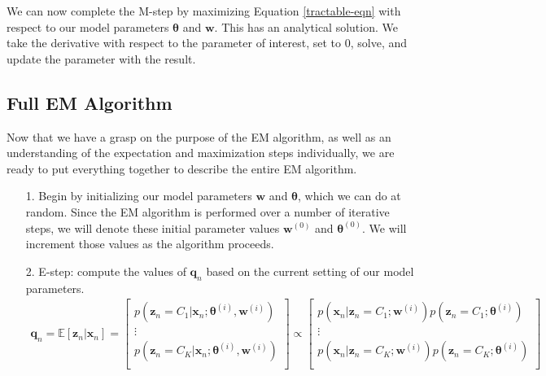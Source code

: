 We can now complete the M-step by maximizing Equation \ref{tractable-eqn} with respect to our model parameters $\boldsymbol{\theta}$ and $\textbf{w}$. This has an analytical solution. We take the derivative with respect to the parameter of interest, set to 0, solve, and update the parameter with the result.

\subsection{Full EM Algorithm}

Now that we have a grasp on the purpose of the EM algorithm, as well as an understanding of the expectation and maximization steps individually, we are ready to put everything together to describe the entire EM algorithm.

\begin{itemize}
    \item[1.] Begin by initializing our model parameters $\textbf{w}$ and $\boldsymbol{\theta}$, which we can do at random. Since the EM algorithm is performed over a number of iterative steps, we will denote these initial parameter values $\textbf{w}^{(0)}$ and $\boldsymbol{\theta}^{(0)}$. We will increment those values as the algorithm proceeds.
    \item[2.] E-step: compute the values of $\textbf{q}_n$ based on the current setting of our model parameters.
    \begin{align*}
        \textbf{q}_n = \mathbb{E}[\textbf{z}_n | \textbf{x}_n] = \begin{bmatrix}
                p(\textbf{z}_n = C_1 | \textbf{x}_n; \boldsymbol{\theta}^{(i)}, \textbf{w}^{(i)}) \\
                \vdots \\
                p(\textbf{z}_n = C_K | \textbf{x}_n; \boldsymbol{\theta}^{(i)}, \textbf{w}^{(i)}) \\
            \end{bmatrix} 
            \propto \begin{bmatrix}
            p(\textbf{x}_n | \textbf{z}_n = C_1; \textbf{w}^{(i)})p(\textbf{z}_n = C_1; \boldsymbol{\theta}^{(i)}) \\
            \vdots \\
            p(\textbf{x}_n | \textbf{z}_n = C_K; \textbf{w}^{(i)})p(\textbf{z}_n = C_K; \boldsymbol{\theta}^{(i)}) \\
        \end{bmatrix} \\
    \end{align*}

\end{itemize}
